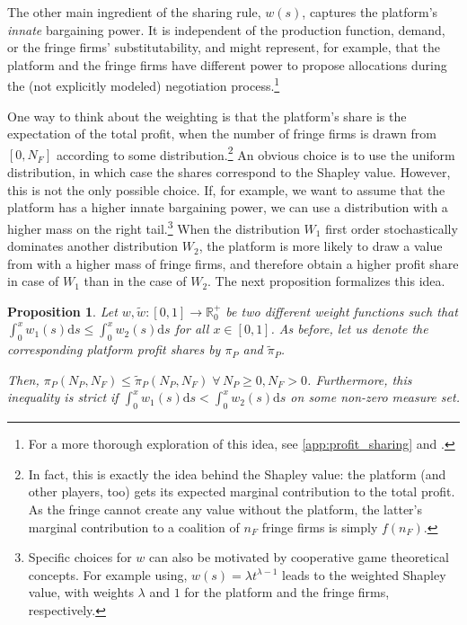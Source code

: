 \documentclass[a4paper]{article}
\newtheorem{proposition}{Proposition}
\newcommand{\ds}{\mathrm{d}s}
\begin{document}
The other main ingredient of the sharing rule, $w(s)$, captures the platform's \emph{innate} bargaining power.
It is independent of the production function, demand, or the fringe firms' substitutability, and might represent, for example, that the platform and the fringe firms have different power to propose allocations during the (not explicitly modeled) negotiation process.\footnote{
    For a more thorough exploration of this idea, see \cref{app:profit_sharing} and \textcite{hart1996bargaining}.
}

One way to think about the weighting is that the platform's share is the expectation of the total profit, when the number of fringe firms is drawn from $[0, N_F]$ according to some distribution.\footnote{
    In fact, this is exactly the idea behind the Shapley value: the platform (and other players, too) gets its expected marginal contribution to the total profit.
    As the fringe cannot create any value without the platform, the latter's marginal contribution to a coalition of $n_F$ fringe firms is simply $f(n_F)$.
}
An obvious choice is to use the uniform distribution, in which case the shares correspond to the Shapley value.
However, this is not the only possible choice.
If, for example, we want to assume that the platform has a higher innate bargaining power, we can use a distribution with a higher mass on the right tail.\footnote{
    Specific choices for $w$ can also be motivated by cooperative game theoretical concepts.
    For example using, $w(s) = \lambda t^{\lambda - 1}$ leads to the weighted Shapley value, with weights $\lambda$ and $1$ for the platform and the fringe firms, respectively.
}
When the distribution $W_1$ first order stochastically dominates another distribution $W_2$, the platform is more likely to draw a value from with a higher mass of fringe firms, and therefore obtain a higher profit share in case of $W_1$ than in the case of $W_2$.
The next proposition formalizes this idea.
\begin{proposition}
    \label{prop:innate_bargaining_power}
    Let $w, \tilde{w}: [0, 1] \to \mathbb{R}_0^+$ be two different weight functions such that $\int_0^x w_1(s) \ds \leq \int_0^x w_2(s) \ds$ for all $x \in [0, 1]$.
    As before, let us denote the corresponding platform profit shares by $\pi_P$ and $\tilde{\pi}_P$.
    
    Then, $\pi_P(N_P, N_F) \leq \tilde{\pi}_P(N_P, N_F) \; \forall\, N_P \geq 0, N_F > 0$.
    Furthermore, this inequality is strict if $\int_0^x w_1(s) \ds < \int_0^x w_2(s) \ds$ on some non-zero measure set.
\end{proposition}
\end{document}
